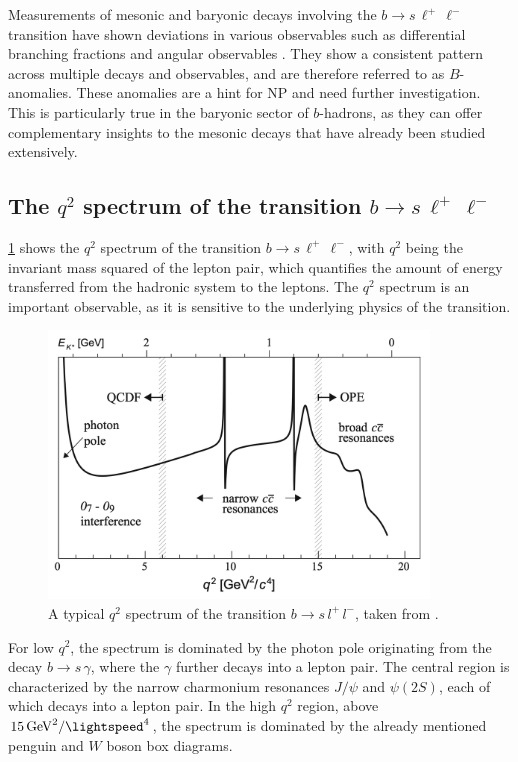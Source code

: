 Measurements of mesonic and baryonic decays involving the $b \to s \, \ell^+ \, \ell^-$ transition have shown deviations in various observables such as differential branching fractions and angular observables \cite{b-anomalies_1, b-anomalies_2}. They show a consistent pattern across multiple decays and observables, and are therefore referred to as $B$-anomalies. These anomalies are a hint for NP and need further investigation. This is particularly true in the baryonic sector of $b$-hadrons, as they can offer complementary insights to the mesonic decays that have already been studied extensively.

\subsection{\texorpdfstring{The $q^2$ spectrum of the transition $b \to s \, \ell^+ \, \ell^-$}{The q2 spectrum of the transition b to s mumu}}
\label{sec:q2-spectrum}
\cref{fig:q2-spectrum} shows the $q^2$ spectrum of the transition $b \to s \, \ell^+ \, \ell^-$, with $q^2$ being the invariant mass squared 
of the lepton pair, which quantifies the amount of energy transferred from the hadronic system to the leptons. The $q^2$ spectrum is an important 
observable, as it is sensitive to the underlying physics of the transition.
\begin{figure}
    \centering
    \includegraphics[width=0.9\textwidth]{figures/q2.png}
    \caption{A typical $q^2$ spectrum of the transition $b \to s \, l^+ \, l^-$, taken from \cite{blake2015}.}
    \label{fig:q2-spectrum}
\end{figure}

For low $q^2$, the spectrum is dominated by the photon pole originating from the decay $b \to s \, \gamma$, where the $\gamma$
further decays into a lepton pair. The central region is characterized by the narrow charmonium resonances $J/\psi$ and $\psi(2S)$,
each of which decays into a lepton pair. In the high $q^2$ region, above $\qty{15}{\giga\electronvolt\squared\per\lightspeed\tothe{4}}$,
the spectrum is dominated by the already mentioned penguin and $W$ boson box diagrams.